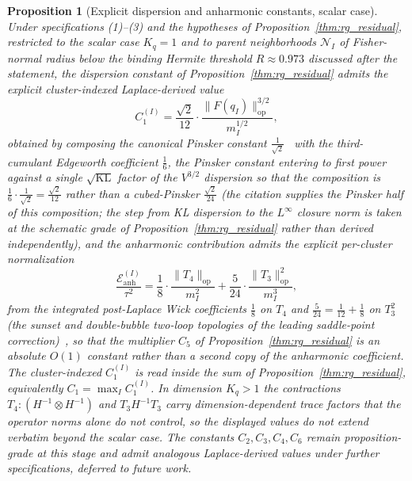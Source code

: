 \documentclass[11pt]{article}
\newtheorem{proposition}{Proposition}
\begin{document}
\begin{proposition}[Explicit dispersion and anharmonic constants, scalar case]
\label{thm:rg_residual_explicit}
Under specifications (1)--(3) and the hypotheses of Proposition~\ref{thm:rg_residual}, restricted to the scalar case $K_q = 1$ and to parent neighborhoods $\mathcal{N}_I$ of Fisher-normal radius below the binding Hermite threshold $R \approx 0.973$ discussed after the statement, the dispersion constant of Proposition~\ref{thm:rg_residual} admits the explicit cluster-indexed Laplace-derived value
\begin{equation}
C_1^{(I)} = \frac{\sqrt 2}{12} \cdot \frac{\|F(q_I)\|_{\mathrm{op}}^{3/2}}{m_I^{1/2}},
\label{eq:rg_C1_explicit}
\end{equation}
obtained by composing the canonical Pinsker constant $\tfrac{1}{\sqrt 2}$~\cite{CoverThomas2006} with the third-cumulant Edgeworth coefficient $\tfrac{1}{6}$, the Pinsker constant entering to first power against a single $\sqrt{\mathrm{KL}}$ factor of the $V^{3/2}$ dispersion so that the composition is $\tfrac{1}{6}\cdot\tfrac{1}{\sqrt 2} = \tfrac{\sqrt 2}{12}$ rather than a cubed-Pinsker $\tfrac{\sqrt 2}{24}$ (the citation supplies the Pinsker half of this composition; the step from KL dispersion to the $L^\infty$ closure norm is taken at the schematic grade of Proposition~\ref{thm:rg_residual} rather than derived independently), and the anharmonic contribution admits the explicit per-cluster normalization
\begin{equation}
\frac{\mathcal{E}_{\mathrm{anh}}^{(I)}}{\tau^2} = \frac{1}{8} \cdot \frac{\|T_4\|_{\mathrm{op}}}{m_I^2} + \frac{5}{24} \cdot \frac{\|T_3\|_{\mathrm{op}}^2}{m_I^3},
\label{eq:rg_C5_explicit}
\end{equation}
from the integrated post-Laplace Wick coefficients $\tfrac{1}{8}$ on $T_4$ and $\tfrac{5}{24} = \tfrac{1}{12} + \tfrac{1}{8}$ on $T_3^2$ (the sunset and double-bubble two-loop topologies of the leading saddle-point correction)~\cite{BenderOrszag1999, wong2001asymptotic}, so that the multiplier $C_5$ of Proposition~\ref{thm:rg_residual} is an absolute $O(1)$ constant rather than a second copy of the anharmonic coefficient. The cluster-indexed $C_1^{(I)}$ is read inside the sum of Proposition~\ref{thm:rg_residual}, equivalently $C_1 = \max_I C_1^{(I)}$. In dimension $K_q > 1$ the contractions $T_4 \mathbin{:} (H^{-1} \otimes H^{-1})$ and $T_3 H^{-1} T_3$ carry dimension-dependent trace factors that the operator norms alone do not control, so the displayed values do not extend verbatim beyond the scalar case. The constants $C_2, C_3, C_4, C_6$ remain proposition-grade at this stage and admit analogous Laplace-derived values under further specifications, deferred to future work.
\end{proposition}
\end{document}
